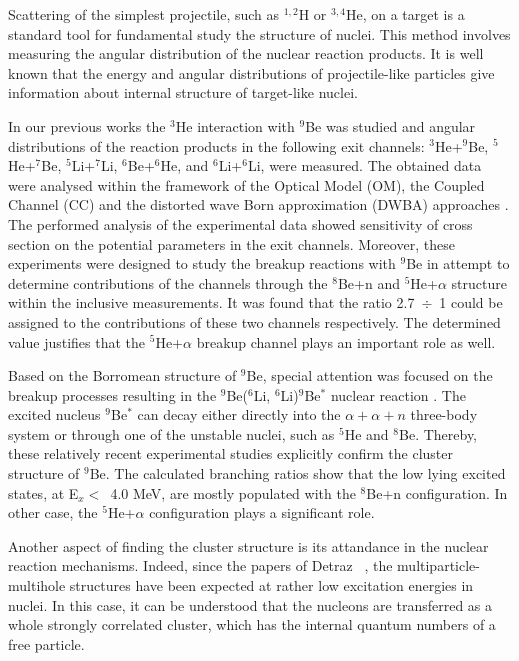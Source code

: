\documentclass[10pt]{iopart}
\begin{document}
	Scattering of the simplest projectile, such as $^{1,2}$H or $^{3,4}$He, on a target is a standard tool for fundamental study the structure of nuclei. 
	This method involves measuring the angular distribution of the nuclear reaction products.
	It is well known that the energy and angular distributions of projectile-like particles give information about internal structure of target-like nuclei.
	
	In our previous works \cite{lukyanov2014, lukyanov2015, janseitov2018} the $^3$He interaction with $^9$Be was studied and angular distributions of the reaction products in the following exit channels: $^3$He+$^9$Be, $^5$He+$^7$Be, $^5$Li+$^7$Li, $^6$Be+$^6$He, and $^6$Li+$^6$Li, were measured. The obtained data were analysed within the framework of the Optical Model (OM), the Coupled Channel (CC) and the distorted wave Born approximation (DWBA) approaches  . 
	The performed analysis of the experimental data showed  sensitivity of cross section on the potential parameters in the exit channels. 
	Moreover, these experiments were designed to study the breakup reactions with $^9$Be in attempt to determine contributions of the channels through the $^8$Be+n  and  $^5$He+$\alpha$ structure within the inclusive measurements.
	It was found that the ratio 2.7~$\div$~1 could be assigned to the contributions of these two channels respectively. The determined value justifies that the $^5$He+$\alpha$ breakup channel plays an important role as well. 

Based on the Borromean structure of $^9$Be, special attention was focused on the breakup processes resulting in the $^9$Be($^6$Li, $^6$Li)$^9$Be$^*$ nuclear reaction \cite{brown2007, papka2007}. The excited nucleus $^9$Be$^*$ can decay either directly into the $\alpha+\alpha+n$ three-body system or through one of the unstable nuclei, such as $^5$He and $^8$Be. Thereby, these relatively recent experimental studies explicitly confirm the cluster structure of $^9$Be. 
The calculated branching ratios  show that the low lying excited states, at E$_x <$~4.0 MeV,  are mostly populated with the $^8$Be+n configuration. In other case, the $^5$He+$\alpha$ configuration plays a significant  role.

Another aspect of finding the cluster structure is its attandance in the nuclear reaction mechanisms. Indeed, since the papers of Detraz \etal~\cite{detraz1970, detraz1974}, the multiparticle-multihole structures have been expected at rather low excitation energies in nuclei. In this case, it can be understood that the nucleons are transferred as a whole strongly correlated cluster, which has the internal quantum numbers of a free particle.
\end{document}
